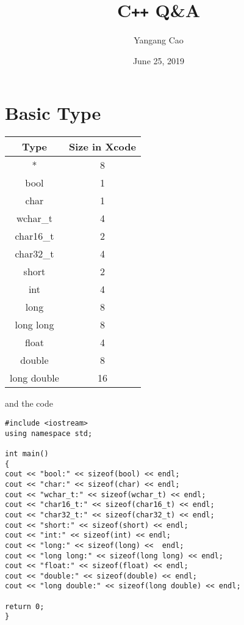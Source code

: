 \documentclass[10pt,a4paper,oneside]{article}
\date{June 25, 2019}
\author{Yangang Cao}
\title{C\texttt{++} Q\&A}
\begin{document}
\maketitle
\tableofcontents

\newpage
\section{Basic Type}
\begin{center}
\begin{tabular}{cc}
	\hline
	Type& Size in Xcode\\
	\hline
	*&8\\
	bool& 1\\
	char& 1\\
	wchar\_t&4\\
	char16\_t&2\\
	char32\_t&4\\
	short&2\\
	int&4\\
	long&8\\
	long long&8\\
	float&4\\
	double&8\\
	long double&16\\
	\hline
\end{tabular}
\end{center}
and the code
\begin{lstlisting}
#include <iostream>
using namespace std;

int main()
{
cout << "bool:" << sizeof(bool) << endl;
cout << "char:" << sizeof(char) << endl;
cout << "wchar_t:" << sizeof(wchar_t) << endl;
cout << "char16_t:" << sizeof(char16_t) << endl;
cout << "char32_t:" << sizeof(char32_t) << endl;
cout << "short:" << sizeof(short) << endl;
cout << "int:" << sizeof(int) << endl;
cout << "long:" << sizeof(long) <<  endl;
cout << "long long:" << sizeof(long long) << endl;
cout << "float:" << sizeof(float) << endl;
cout << "double:" << sizeof(double) << endl;
cout << "long double:" << sizeof(long double) << endl;

return 0;
}
\end{lstlisting}
\end{document}
